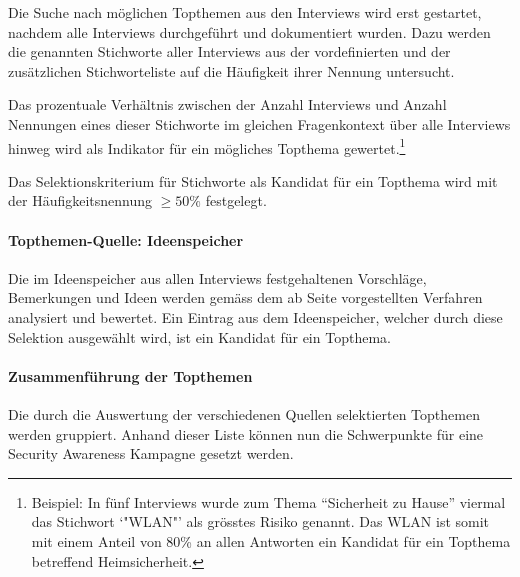 \documentclass[../../main.tex]{subfiles}
\begin{document}
\begin{sloppypar}
Die Suche nach möglichen Topthemen aus den Interviews wird erst gestartet, nachdem alle Interviews durchgeführt und dokumentiert wurden. Dazu werden die genannten Stichworte aller Interviews aus der vordefinierten und der zusätzlichen Stichworteliste auf die Häufigkeit ihrer Nennung untersucht.

Das prozentuale Verhältnis zwischen der Anzahl Interviews und Anzahl Nennungen eines dieser Stichworte im gleichen Fragenkontext über alle Interviews hinweg wird als Indikator für ein mögliches Topthema gewertet.\footnote{Beispiel: In fünf Interviews wurde zum Thema "`Sicherheit zu Hause"' viermal das Stichwort `"WLAN"' als grösstes Risiko genannt. Das WLAN ist somit mit einem Anteil von 80\% an allen Antworten ein Kandidat für ein Topthema betreffend Heimsicherheit.}

Das Selektionskriterium für Stichworte als Kandidat für ein Topthema wird mit der Häufigkeitsnennung $\ge  50\%$ festgelegt.
\end{sloppypar}

\paragraph*{Topthemen-Quelle: Ideenspeicher}\mbox{}

\begin{sloppypar}
Die im Ideenspeicher aus allen Interviews festgehaltenen Vorschläge, Bemerkungen und Ideen werden gemäss dem ab Seite \pageref{auswertung_interview} vorgestellten Verfahren analysiert und bewertet. Ein Eintrag aus dem Ideenspeicher, welcher durch diese Selektion ausgewählt wird, ist ein Kandidat für ein Topthema. 
\end{sloppypar}

\paragraph*{Zusammenführung der Topthemen}\mbox{}

\begin{sloppypar}
Die durch die Auswertung der verschiedenen Quellen selektierten Topthemen werden gruppiert. Anhand dieser Liste können nun die Schwerpunkte für eine Security Awareness Kampagne gesetzt werden.
\end{sloppypar}
\end{document}
